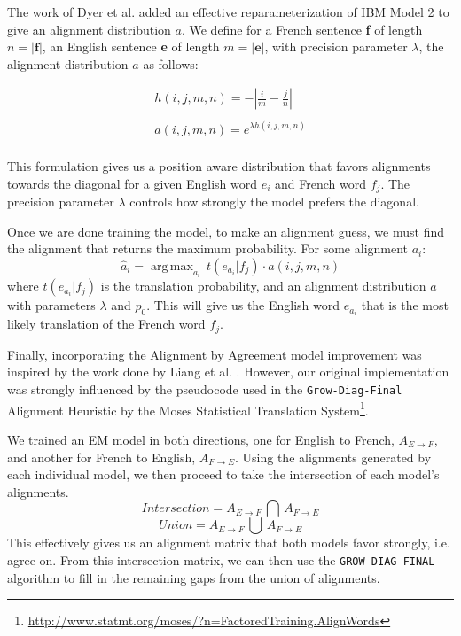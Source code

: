 \documentclass[twoside,twocolumn]{article}
\DeclareMathOperator*{\argmax}{arg\,max}
\begin{document}
The work of Dyer et al. \cite{dyer2013simple} added an effective reparameterization of IBM Model 2 to give an alignment distribution $a$. We define for a French sentence \textbf{f} of length $n = |\textbf{f}|$, an English sentence \textbf{e} of length $m=|\textbf{e}|$, with precision parameter $\lambda$, the alignment distribution $a$ as follows:

\begin{equation}
\begin{split}
h(i,j,m,n) = - \left| \frac{i}{m} - \frac{j}{n}\right| \\
\\
a(i,j,m,n) =e^{  \lambda h(i,j,m,n)} \\
\end{split}
\end{equation}

This formulation gives us a position aware distribution that favors alignments towards the diagonal for a given English word $e_i$ and French word $f_j$. The precision parameter $\lambda$ controls how strongly the model prefers the diagonal.

Once we are done training the model, to make an alignment guess, we must find the alignment that returns the maximum probability. For some alignment $a_i$:
\begin{equation}
\hat{a}_i = \argmax_{a_i} \, t(e_{a_i}|f_j) \cdot a(i, j, m, n)
\end{equation}
where $t(e_{a_i}|f_j)$ is the translation probability, and an alignment distribution $a$ with parameters $\lambda$ and $p_0$. This will give us the English word $e_{a_i}$ that is the most likely translation of the French word $f_j$.

Finally, incorporating the Alignment by Agreement model improvement was inspired by the work done by Liang et al. \cite{liang2006alignment}. However, our original implementation was strongly influenced by the pseudocode used in the \texttt{Grow-Diag-Final} Alignment Heuristic by the Moses Statistical Translation System\footnote{\url{http://www.statmt.org/moses/?n=FactoredTraining.AlignWords}}.

We trained an EM model in both directions, one for English to French, $A_{E \rightarrow F}$, and another for French to English, $A_{F \rightarrow E}$. Using the alignments generated by each individual model, we then proceed to take the intersection of each model's alignments.
\begin{equation}
Intersection = A_{E \rightarrow F} \, \bigcap \, A_{F \rightarrow E}
\end{equation}
\begin{equation}
Union = A_{E \rightarrow F} \, \bigcup \, A_{F \rightarrow E}
\end{equation}
This effectively gives us an alignment matrix that both models favor strongly, i.e. agree on. From this intersection matrix, we can then use the \texttt{GROW-DIAG-FINAL} algorithm to fill in the remaining gaps from the union of alignments.
\end{document}
